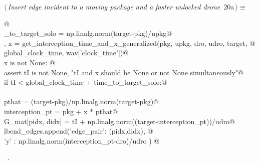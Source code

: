 \documentclass[10pt, english, oneside]{report}
\begin{document}
\begin{flushleft} \small
\begin{minipage}{\linewidth}\label{scrap19}\raggedright\small
{} $\langle\,${\itshape Insert edge incident to a moving package and a faster unlocked drone}\nobreak\ {\footnotesize {20a}}$\,\rangle\equiv$
\vspace{-1ex}
\begin{list}{}{} \item
\mbox{}\verb@   @\\
\mbox{}\verb@time_to_target_solo = np.linalg.norm(target-pkg)/upkg@\\
\mbox{}\verb@tI, x  = get_interception_time_and_x_generalized(pkg, upkg, dro, udro, target, @\\
\mbox{}\verb@                                                global_clock_time, wav['clock_time'])@\\
\mbox{}\verb@if x is not None: @\\
\mbox{}\verb@   assert tI is not None, "tI and x should be None or not None simultaneously"@\\
\mbox{}\verb@   if tI < global_clock_time + time_to_target_solo:@\\
\mbox{}\verb@@\\
\mbox{}\verb@     pthat             = (target-pkg)/np.linalg.norm(target-pkg)@\\
\mbox{}\verb@     interception_pt   = pkg + x * pthat@\\
\mbox{}\verb@     G_mat[pidx, didx] = tI + np.linalg.norm((target-interception_pt))/udro@\\
\mbox{}\verb@     lbend_edges.append({'edge_pair': (pidx,didx), @\\
\mbox{}\verb@                         'y'       : np.linalg.norm(interception_pt-dro)/udro }) @\\
\mbox{}\verb@@{\NWsep}
\end{list}
\vspace{-1.5ex}
\footnotesize
\begin{list}{}{\setlength{\itemsep}{-\parsep}\setlength{\itemindent}{-\leftmargin}}
\item \NWtxtMacroRefIn\ .

\item{}
\end{list}
\end{minipage}\vspace{4ex}
\end{flushleft}
\end{document}
